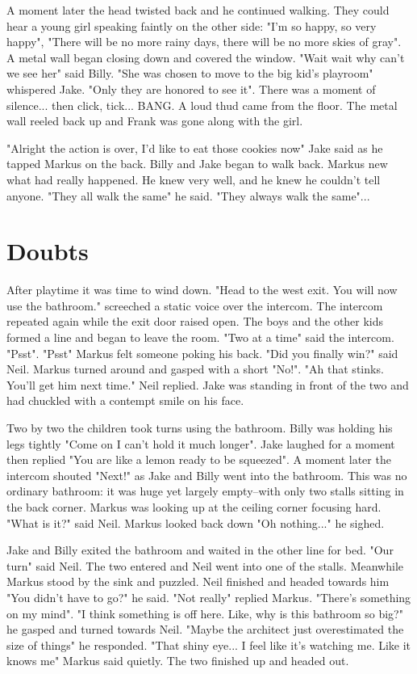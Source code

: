 \documentclass[12pt]{book}
\begin{document}
A moment later the head twisted back and he continued walking. They could hear a young girl speaking faintly on the other side: "I'm so happy, so very happy", "There will be no more rainy days, there will be no more skies of gray". A metal wall began closing down and covered the window. "Wait wait why can't we see her" said Billy. "She was chosen to move to the big kid's playroom" whispered Jake. "Only they are honored to see it". There was a moment of silence... then click, tick... BANG. A loud thud came from the floor. The metal wall reeled back up and Frank was gone along with the girl.

"Alright the action is over, I'd like to eat those cookies now" Jake said as he tapped Markus on the back. Billy and Jake began to walk back. Markus new what had really happened. He knew very well, and he knew he couldn't tell anyone. "They all walk the same" he said. "They always walk the same"...

\chapter{Doubts}

After playtime it was time to wind down. "Head to the west exit. You will now use the bathroom." screeched a static voice over the intercom. The intercom repeated again while the exit door raised open. The boys and the other kids formed a line and began to leave the room. "Two at a time" said the intercom. "Psst". "Psst" Markus felt someone poking his back. "Did you finally win?" said Neil. Markus turned around and gasped with a short "No!". "Ah that stinks. You'll get him next time." Neil replied. Jake was standing in front of the two and had chuckled with a contempt smile on his face.

Two by two the children took turns using the bathroom. Billy was holding his legs tightly "Come on I can't hold it much longer". Jake laughed for a moment then replied "You are like a lemon ready to be squeezed". A moment later the intercom shouted "Next!" as Jake and Billy went into the bathroom. This was no ordinary bathroom: it was huge yet largely empty--with only two stalls sitting in the back corner. Markus was looking up at the ceiling corner focusing hard. "What is it?" said Neil. Markus looked back down "Oh nothing..." he sighed.

Jake and Billy exited the bathroom and waited in the other line for bed. "Our turn" said Neil. The two entered and Neil went into one of the stalls. Meanwhile Markus stood by the sink and puzzled. Neil finished and headed towards him "You didn't have to go?" he said. "Not really" replied Markus. "There's something on my mind". "I think something is off here. Like, why is this bathroom so big?" he gasped and turned towards Neil. "Maybe the architect just overestimated the size of things" he responded. "That shiny eye... I feel like it's watching me. Like it knows me" Markus said quietly. The two finished up and headed out.
\end{document}
